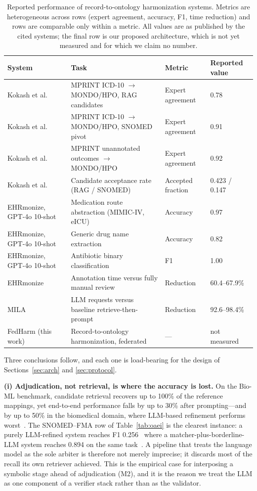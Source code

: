 \documentclass[conference]{IEEEtran}
\begin{document}
\begin{table}[t]
\caption{Reported performance of record-to-ontology harmonization systems. Metrics are heterogeneous across rows (expert agreement, accuracy, F1, time reduction) and rows are comparable only within a metric. All values are as published by the cited systems; the final row is our proposed architecture, which is not yet measured and for which we claim no number.}
\label{tab:reported}
\centering
\footnotesize
\begin{tabular}{@{}llll@{}}
\toprule
\textbf{System} & \textbf{Task} & \textbf{Metric} & \textbf{Reported value} \\
\midrule
Kokash et al.~\cite{b1} & MPRINT ICD-10 $\rightarrow$ MONDO/HPO, RAG candidates & Expert agreement & 0.78 \\
Kokash et al.~\cite{b1} & MPRINT ICD-10 $\rightarrow$ MONDO/HPO, SNOMED pivot & Expert agreement & 0.91 \\
Kokash et al.~\cite{b1} & MPRINT unannotated outcomes $\rightarrow$ MONDO/HPO & Expert agreement & 0.92 \\
Kokash et al.~\cite{b1} & Candidate acceptance rate (RAG / SNOMED) & Accepted fraction & 0.423 / 0.147 \\
EHRmonize, GPT-4o 10-shot~\cite{b40} & Medication route abstraction (MIMIC-IV, eICU) & Accuracy & 0.97 \\
EHRmonize, GPT-4o 10-shot~\cite{b40} & Generic drug name extraction & Accuracy & 0.82 \\
EHRmonize, GPT-4o 10-shot~\cite{b40} & Antibiotic binary classification & F1 & 1.00 \\
EHRmonize~\cite{b40} & Annotation time versus fully manual review & Reduction & 60.4--67.9\% \\
MILA~\cite{b54} & LLM requests versus baseline retrieve-then-prompt & Reduction & 92.6--98.4\% \\
\midrule
FedHarm (this work) & Record-to-ontology harmonization, federated & --- & not measured \\
\bottomrule
\end{tabular}
\end{table}

Three conclusions follow, and each one is load-bearing for the design of Sections~\ref{sec:arch} and \ref{sec:protocol}.

\textbf{(i) Adjudication, not retrieval, is where the accuracy is lost.} On the Bio-ML benchmark, candidate retrieval recovers up to 100\% of the reference mappings, yet end-to-end performance falls by up to 30\% after prompting---and by up to 50\% in the biomedical domain, where LLM-based refinement performs worst~\cite{b54}. The SNOMED--FMA row of Table~\ref{tab:oaei} is the clearest instance: a purely LLM-refined system reaches F1 0.256~\cite{b56} where a matcher-plus-borderline-LLM system reaches 0.894 on the same task~\cite{b54}. A pipeline that treats the language model as the sole arbiter is therefore not merely imprecise; it discards most of the recall its own retriever achieved. This is the empirical case for interposing a symbolic stage ahead of adjudication (M2), and it is the reason we treat the LLM as one component of a verifier stack rather than as the validator.
\end{document}
